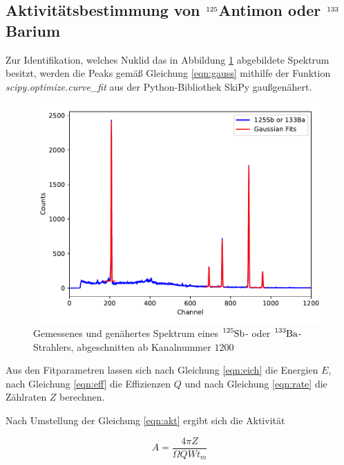 
\subsection{Aktivitätsbestimmung von  $\ce{^{125}}$Antimon oder  $\ce{^{133}}$Barium }

Zur Identifikation, welches Nuklid das in Abbildung \ref{fig:plot3} abgebildete Spektrum besitzt, werden die Peaks gemäß
Gleichung \eqref{eqn:gauss} mithilfe der Funktion \textit{scipy.optimize.curve\_fit} aus der Python-Bibliothek SkiPy
gaußgenähert.

\begin{figure}
  \centering
  \includegraphics[scale=0.7]{content/plot3.pdf}
  \caption{Gemessenes und genähertes Spektrum eines $\ce{^{125}Sb}$- oder  $\ce{^{133}Ba}$-Strahlers,
           abgeschnitten ab Kanalnummer $\num{1200}$}
  \label{fig:plot3}
\end{figure}

Aus den Fitparametren lassen sich nach Gleichung \eqref{eqn:eich} die Energien $E$, nach Gleichung 
\eqref{eqn:eff} die Effizienzen $Q$ und nach Gleichung \eqref{eqn:rate} die Zählraten $Z$ berechnen.

Nach Umstellung der Gleichung \eqref{eqn:akt} ergibt sich die Aktivität

\begin{equation}
  A = \frac{4 \pi Z}{\Omega Q W t_m}
\end{equation}

